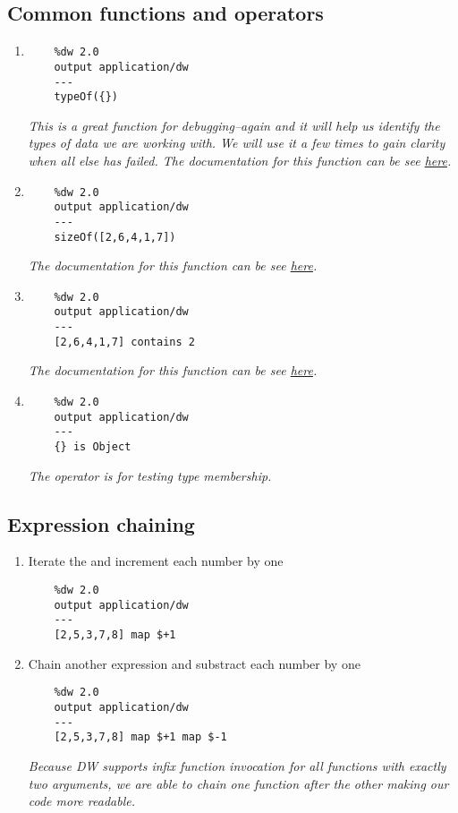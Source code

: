 \subsection{Common functions and operators}
\begin{enumerate}[resume*]
\item {}
  \begin{verbatim}
    %dw 2.0
    output application/dw
    ---
    typeOf({})
  \end{verbatim}
  \emph{
    This is a great function for debugging--again and it will help us identify the types of
    data we are working with.  We will use it a few times to gain clarity when all else has
    failed.
    \newline
    The documentation for this function can be see \href{https://docs.mulesoft.com/mule-runtime/4.3/dw-core-functions-typeof}{here}.
  }
\item {}
  \begin{verbatim}
    %dw 2.0
    output application/dw
    ---
    sizeOf([2,6,4,1,7])
  \end{verbatim}
  \emph{
    The documentation for this function can be see \href{https://docs.mulesoft.com/mule-runtime/4.3/dw-core-functions-sizeof}{here}.
  }
\item {}
  \begin{verbatim}
    %dw 2.0
    output application/dw
    ---
    [2,6,4,1,7] contains 2
  \end{verbatim}
  \emph{
    The documentation for this function can be see \href{https://docs.mulesoft.com/mule-runtime/4.3/dw-core-functions-contains}{here}.
  }
\item {}
  \begin{verbatim}
    %dw 2.0
    output application/dw
    ---
    {} is Object    
  \end{verbatim}
  \emph{
    The  operator is for testing type membership.
  }
\end{enumerate}

\subsection{Expression chaining}
\begin{enumerate}[resume*]
\item Iterate the \ttt{[2,5,3,7,8]} and increment each number by one
  \begin{verbatim}
    %dw 2.0
    output application/dw
    ---
    [2,5,3,7,8] map $+1
  \end{verbatim}
\item Chain another expression and substract each number by one
  \begin{verbatim}
    %dw 2.0
    output application/dw
    ---
    [2,5,3,7,8] map $+1 map $-1
  \end{verbatim}
  \emph{
    Because DW supports infix function invocation for all functions with exactly two arguments, we are able to chain one function after the other making our code more readable.
  }
\end{enumerate}

